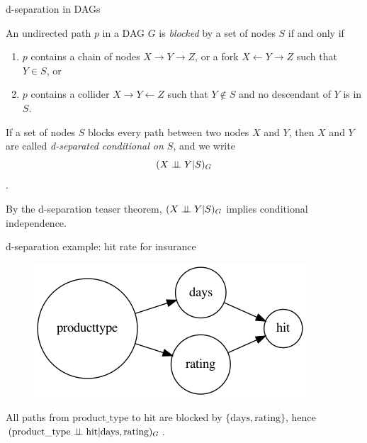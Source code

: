 \begin{frame}{d-separation in DAGs}
  \begin{definition}
    An undirected path $p$ in a DAG $G$ is \emph{blocked} by a set of nodes $S$ if and only if
    \begin{enumerate}
      \item $p$ contains a chain of nodes $X \to Y \to Z$, or a fork $X \leftarrow Y \rightarrow Z$ such that $Y \in S$, or
      \item $p$ contains a collider $X \to Y \leftarrow Z$ such that $Y \notin S$ and no descendant of $Y$ is in $S$.
    \end{enumerate}
  \end{definition}

  \begin{definition}
    If a set of nodes $S$ blocks every path between two nodes $X$ and $Y$, then $X$ and $Y$ are called \emph{d-separated conditional on $S$}, and we write
    $$(X \perp\!\!\!\perp Y | S)_{G}$$.
  \end{definition}

  By the d-separation teaser theorem, $(X \perp\!\!\!\perp Y | S)_{G}$ implies conditional independence.\newline
\end{frame}


\begin{frame}{d-separation example: hit rate for insurance}
  \begin{figure}[ht]
    \centering
    \includegraphics[height=0.5\textheight]{graphics/hits}
  \end{figure}

  All paths from $\mathrm{product\_type}$ to $\mathrm{hit}$ are blocked by $\{\mathrm{days}, \mathrm{rating}\}$, hence $(\mathrm{product\_type} \perp\!\!\!\perp \mathrm{hit} | \mathrm{days}, \mathrm{rating})_G$.
\end{frame}


